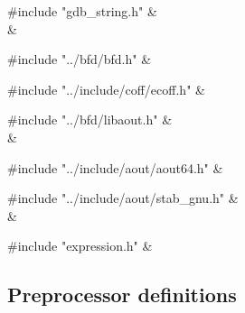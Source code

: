 \medskip
\begin{cxreftabi}
{\stt \#include "gdb\_string.h"} &\\
\hspace*{0.2in}{\stt \#include <string.h>} &\\
\end{cxreftabi}

\medskip
\begin{cxreftabi}
{\stt \#include "../bfd/bfd.h"} &\\
\end{cxreftabi}

\medskip
\begin{cxreftabi}
{\stt \#include "../include/coff/ecoff.h"} &\\
\end{cxreftabi}

\medskip
\begin{cxreftabi}
{\stt \#include "../bfd/libaout.h"} &\\
\hspace*{0.2in}{\stt \#include "../include/bfdlink.h"} &\\
\end{cxreftabi}

\medskip
\begin{cxreftabi}
{\stt \#include "../include/aout/aout64.h"} &\\
\end{cxreftabi}

\medskip
\begin{cxreftabi}
{\stt \#include "../include/aout/stab\_gnu.h"} &\\
\hspace*{0.2in}{\stt \#include "../include/aout/stab.def"} &\\
\end{cxreftabi}

\medskip
\begin{cxreftabi}
{\stt \#include "expression.h"} &\\
\end{cxreftabi}


\subsection*{Preprocessor definitions}

